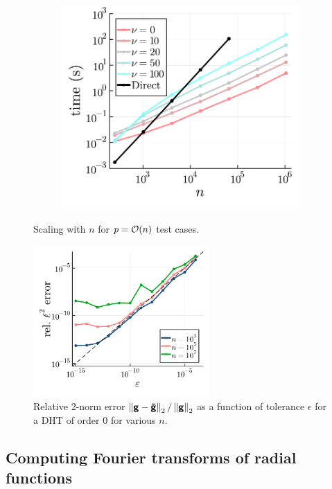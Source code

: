\begin{figure}[!t]
\begin{subfigure}[b]{0.32\textwidth}
  \end{subfigure} 
  \hfill 
  \begin{subfigure}[b]{0.32\textwidth}
    \includegraphics[width=\textwidth]{./figures/nu_scaling.pdf}
  \end{subfigure}
  \caption{Scaling with $n$ for $p = \bO(n)$ test cases.}
  \label{fig:both-scaling}
\end{figure}

\begin{figure}[!t]
  \centering
  \includegraphics[width=0.6\textwidth]{./figures/accuracy.pdf}
  \caption{Relative 2-norm error $\norm[2]{\vct{g} - \vct{\tilde{g}}} /
  \norm[2]{\vct{g}}$ as a function of tolerance $\epsilon$ for a DHT of order
  $0$ for various $n$.}
  \label{fig:accuracy}
\end{figure}

\subsection{Computing Fourier transforms of radial functions}

